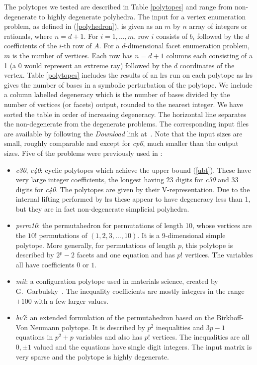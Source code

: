 \documentclass[a4paper,11pt]{article}   \usepackage{authblk} \usepackage[top=1.9cm,bottom=1.9cm,left=1.9cm,right=1.9cm]{geometry}
\newcommand{\progname}{\textsf}
\newcommand{\lrs}{\progname{lrs}\xspace}
\newcommand{\polytope}{\emph}
\newcommand{\bvseven}{\polytope{bv7}\xspace}
\newcommand{\cthirty}{\polytope{c30}\xspace}
\newcommand{\cforty}{\polytope{c40}\xspace}
\newcommand{\mitine}{\polytope{mit}\xspace}
\newcommand{\permten}{\polytope{perm10}\xspace}
\newcommand{\cpsix}{\polytope{cp6}\xspace}
\begin{document}
The polytopes we tested are described in Table \ref{polytopes} and range from non-degenerate
to highly degenerate polyhedra. 
The input for a vertex enumeration problem, as defined in (\ref{polyhedron}),
is given as an $m$ by $n$ array of integers or rationals, where $n=d+1$.
For $i=1,\ldots,m$, row $i$ consists of $b_i$ followed by the $d$ coefficients of the $i$-th row of $A$.
For a $d$-dimensional facet enumeration problem, $m$ is the number of vertices.
Each row has $n=d+1$ columns each consisting of a 1 (a 0 would represent an extreme ray)
followed by the $d$ coordinates of the vertex.
Table \ref{polytopes} includes the results of an \lrs run on each
polytope as  \lrs
gives the number of bases in a symbolic perturbation of the polytope.
We include a column labelled degeneracy which is the number of bases divided by the number of vertices (or facets) output, rounded to the
nearest integer. We have sorted the table in order of increasing degeneracy. The horizontal line separates the
non-degenerate from the degenerate problems.
The corresponding input files are available by following the {\em Download}
link  at~\cite{lrs}.
Note that the input sizes are small, roughly comparable and except for \cpsix, much smaller than the output
sizes.
Five of the problems were previously used in \cite{AR13}:
\begin{itemize}
\item \cthirty, \cforty: cyclic polytopes which achieve the upper bound (\ref{ubt}).
These have very large integer coefficients, the longest having 23 digits
for \cthirty and 33 digits for \cforty. The polytopes are given by their V-representation. Due to the internal lifting performed
by \lrs these appear to have degeneracy less than 1, but they are in fact non-degenerate
simplicial polyhedra.
\item \permten: the permutahedron for permutations of length 10, whose vertices are
the $10!$ permutations of $(1,2,3,\ldots,10)$. It is a 9-dimensional simple
polytope. More generally, for permutations of length $p$, this polytope is described by $2^p -2$ facets and one equation
and has $p!$ vertices.
The variables all have coefficients $0$ or $1$.
\item \mitine: a configuration polytope used in materials science, created by G.\ Garbulsky~\cite{ceder1994}.
The inequality coefficients are mostly integers in the range $\pm 100$ with a few larger values.
\item \bvseven: an extended formulation of the permutahedron based on the  Birkhoff-Von Neumann polytope.
It is described by $p^2$ inequalities and $3p-1$ equations in $p^2+p$ variables and also has $p!$ vertices.
The inequalities are all $0,\pm 1$ valued and the equations have single digit integers. The input matrix
is very sparse and the polytope is
highly degenerate.
\end{itemize}
\end{document}

